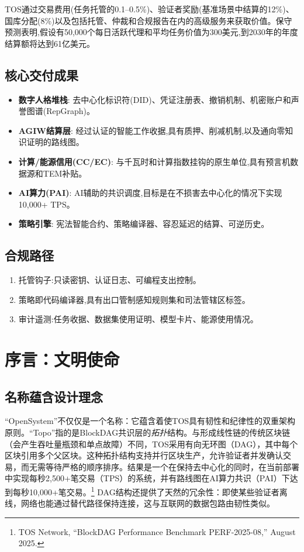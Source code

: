 \documentclass[11pt]{article}
\begin{document}
TOS通过交易费用(任务托管的0.1--0.5\%)、验证者奖励(基准场景中结算的12\%)、国库分配(8\%)以及包括托管、仲裁和合规报告在内的高级服务来获取价值。保守预测表明,假设有50,000个每日活跃代理和平均任务价值为300美元,到2030年的年度结算额将达到61亿美元。

\subsection{核心交付成果}
\begin{itemize}[noitemsep]
  \item \textbf{数字人格堆栈}: 去中心化标识符(DID)、凭证注册表、撤销机制、机密账户和声誉图谱(RepGraph)。
  \item \textbf{AGIW结算层}: 经过认证的智能工作收据,具有质押、削减机制,以及通向零知识证明的路线图。
  \item \textbf{计算/能源信用(CC/EC)}: 与千瓦时和计算指数挂钩的原生单位,具有预言机数据源和TEM补贴。
  \item \textbf{AI算力(PAI)}: AI辅助的共识调度,目标是在不损害去中心化的情况下实现10,000+ TPS。
  \item \textbf{策略引擎}: 宪法智能合约、策略编译器、容忍延迟的结算、可逆历史。
\end{itemize}

\subsection{合规路径}
\begin{enumerate}[noitemsep]
  \item 托管钩子:只读密钥、认证日志、可编程支出控制。
  \item 策略即代码编译器,具有出口管制感知规则集和司法管辖区标签。
  \item 审计遥测:任务收据、数据集使用证明、模型卡片、能源使用情况。
\end{enumerate}

\section{序言：文明使命}
\subsection{名称蕴含设计理念}
``OpenSystem''不仅仅是一个名称：它蕴含着使TOS具有韧性和纪律性的双重架构原则。``Topo''指的是BlockDAG共识层的\emph{拓扑}结构。与形成线性链的传统区块链（会产生吞吐量瓶颈和单点故障）不同，TOS采用有向无环图（DAG），其中每个区块引用多个父区块。这种拓扑结构支持并行区块生产，允许验证者并发确认交易，而无需等待严格的顺序排序。结果是一个在保持去中心化的同时，在当前部署中实现每秒2,500+笔交易（TPS）的系统，并有路线图在AI算力共识（PAI）下达到每秒10,000+笔交易。\footnote{TOS Network, ``BlockDAG Performance Benchmark PERF-2025-08,'' August 2025.} DAG结构还提供了天然的冗余性：即使某些验证者离线，网络也能通过替代路径保持连接，这与互联网的数据包路由韧性类似。
\end{document}
